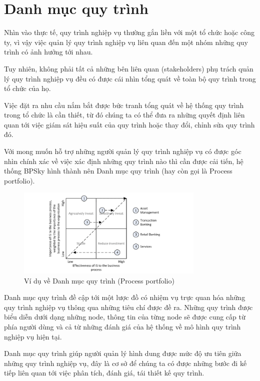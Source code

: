 \section{Danh mục quy trình}

Nhìn vào thực tế, quy trình nghiệp vụ thường gắn liền với một tổ chức hoặc công ty, vì vậy việc quản lý quy trình nghiệp vụ liên quan đến một nhóm những quy trình có ảnh hưởng tới nhau. 

Tuy nhiên, không phải tất cả những bên liên quan (stakeholders) phụ trách quản lý quy trình nghiệp vụ đều có được cái nhìn tổng quát về toàn bộ quy trình trong tổ chức của họ. 

Việc đặt ra nhu cầu nắm bắt được bức tranh tổng quát về hệ thống quy trình trong tổ chức là cần thiết, từ đó chúng ta có thể đưa ra những quyết định liên quan tới việc giám sát hiệu suất của quy trình hoặc thay đổi, chỉnh sửa quy trình đó.

Với mong muốn hỗ trợ những người quản lý quy trình nghiệp vụ có được góc nhìn chính xác về việc xác định những quy trình nào thì cần được cải tiến, hệ thống BPSky hình thành nên Danh mục quy trình (hay còn gọi là Process portfolio). 

\begin{figure}[H]
    \begin{center}
        \includegraphics[width=0.8\textwidth]{Content/Cơ sở lý thuyết/documents/Process portfolio/images/ProcessPortfolioIllustration.png}
        \vspace{0.5cm}
        \caption{Ví dụ về Danh mục quy trình (Process portfolio)}
        \label{fig: Ví dụ về Danh mục quy trình (Process portfolio)}
    \end{center}
\end{figure}

Danh mục quy trình đề cập tới một lược đồ có nhiệm vụ trực quan hóa những quy trình nghiệp vụ thông qua những tiêu chí được đề ra. Những quy trình được biểu diễn dưới dạng những node, thông tin của từng node sẽ được cung cấp từ phía người dùng và cả từ những đánh giá của hệ thống về mô hình quy trình nghiệp vụ hiện tại.

Danh mục quy trình giúp người quản lý hình dung được mức độ ưu tiên giữa những quy trình nghiệp vụ, đây là cơ sở để chúng ta có được những bước đi kế tiếp liên quan tới việc phân tích, đánh giá, tái thiết kế quy trình.